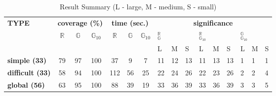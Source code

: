 \documentclass[sigconf,review,anonymous]{acmart}
\newcommand{\Random}{\mathbb{R}}
\newcommand{\Genetic}{\mathbb{G}}
\newcommand{\RGenetic}{\mathbb{G}_{10}}
\begin{document}
\begin{table}[!t]
  \caption{Result Summary (L - large, M - medium, S - small)}
  \label{tbl.stats.sum}
    \footnotesize
    \begin{tabular}{l|ccc|ccc|p{3mm}p{3mm}p{3mm}|p{3mm}p{3mm}p{3mm}|p{3mm}p{3mm}p{3mm}}
      \toprule
      \multirow{3}{*}{\textbf{TYPE}} &  \multicolumn{3}{c|}{\textbf{coverage (\%)}} & \multicolumn{3}{c|}{\textbf{time (sec.)}} & \multicolumn{9}{c}{\textbf{significance}}\\
      \cline{2-16}
                                     & \multirow{2}{*}{$\Random$}  & \multirow{2}{*}{$\Genetic$} & \multirow{2}{*}{$\RGenetic$} & \multirow{2}{*}{$\Random$}  & \multirow{2}{*}{$\Genetic$} & \multirow{2}{*}{$\RGenetic$} & \multicolumn{3}{p{1cm}|}{\hfil $_{\Genetic}^{\Random}$} & \multicolumn{3}{p{1cm}|}{\hfil $_{\RGenetic}^{\Random}$} & \multicolumn{3}{p{1cm}}{\hfil $_{\RGenetic}^{\Genetic}$} \\
      \cline{8-16}
                         & & & & & &                     & L  & M  & S  & L  & M  & S  & L & M & S \\
      \midrule
      \textbf{simple (33)}    & 79 & 97 & 100 & 37  & 9  & 7  & 11 & 12 & 13 & 11 & 13 & 13 & 1 & 1 & 1 \\
      \textbf{difficult (33)} & 58 & 94 & 100 & 112 & 56 & 25 & 22 & 24 & 26 & 22 & 23 & 26 & 2 & 2 & 4 \\
      \midrule
      \textbf{global (56)}    & 63 & 95 & 100 & 88  & 39 & 19 & 33 & 36 & 39 & 33 & 36 & 39 & 3 & 3 & 5 \\
      \bottomrule
    \end{tabular}
\end{table}
\end{document}
